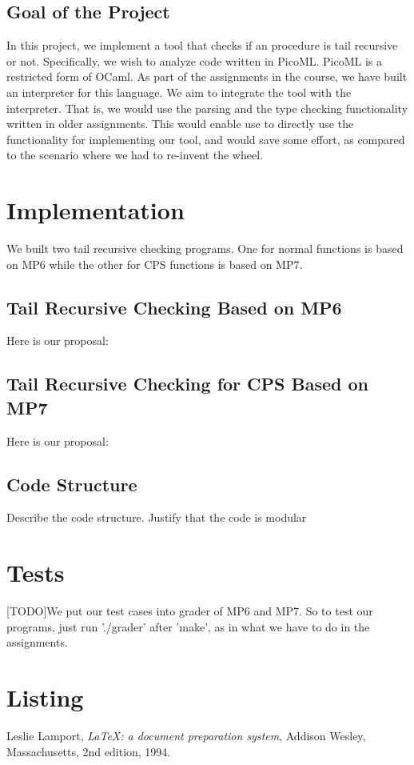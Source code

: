 \documentclass{article}
\begin{document}
\subsection{Goal of the Project}
In this project, we implement a tool that checks if an procedure is tail recursive or not.
Specifically, we wish to analyze code written in PicoML. 
PicoML is a restricted form of OCaml. 
As part of the assignments in the course, we have built an interpreter for this language.
We aim to integrate the tool with the interpreter. 
That is, we would use the parsing and the type checking functionality written in older assignments.
This would enable use to directly use the functionality for implementing our tool, and would save some  effort, as compared to the scenario where we had to re-invent the wheel.

\section{Implementation}
We built two tail recursive checking programs. One for normal functions is based on MP6 while the other for CPS functions is based on MP7. 

\subsection{Tail Recursive Checking Based on MP6}


Here is our proposal:

\subsection{Tail Recursive Checking for CPS Based on MP7}

Here is our proposal:

\subsection{Code Structure}
Describe the code structure.
Justify that the code is modular

\section{Tests}
[TODO]We put our test cases into grader of MP6 and MP7. So to test our programs, just run './grader' after 'make', as in what we have to do in the assignments. 

\newpage

\section{Listing}



\begin{thebibliography}{9}

  Leslie Lamport,
  \emph{\LaTeX: a document preparation system},
  Addison Wesley, Massachusetts,
  2nd edition,
  1994.

\end{thebibliography}
\end{document}
